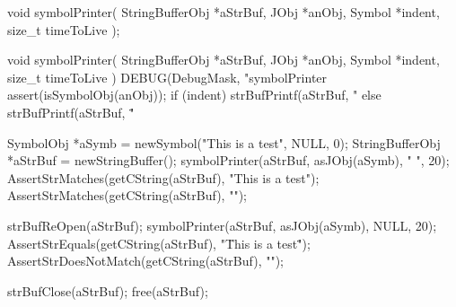 \startTestSuite[symbolPrinter]

\startCHeader
void symbolPrinter(
  StringBufferObj *aStrBuf,
  JObj            *anObj,
  Symbol          *indent,
  size_t           timeToLive
);
\stopCHeader

\startCCode
void symbolPrinter(
  StringBufferObj *aStrBuf,
  JObj            *anObj,
  Symbol          *indent,
  size_t           timeToLive
) {
  DEBUG(DebugMask, "symbolPrinter %
  assert(isSymbolObj(anObj));
  if (indent) {
    strBufPrintf(aStrBuf, "%
  } else {
    strBufPrintf(aStrBuf, "\"%
  }
}
\stopCCode


\startCTest
  SymbolObj *aSymb = newSymbol("This is a test", NULL, 0);
  StringBufferObj *aStrBuf = newStringBuffer();
  symbolPrinter(aStrBuf, asJObj(aSymb), "  ", 20);
  AssertStrMatches(getCString(aStrBuf), "This is a test");
  AssertStrMatches(getCString(aStrBuf), "\n");
  
  strBufReOpen(aStrBuf);
  symbolPrinter(aStrBuf, asJObj(aSymb), NULL, 20);
  AssertStrEquals(getCString(aStrBuf), "\"This is a test\" ");
  AssertStrDoesNotMatch(getCString(aStrBuf), "\n");
  
  strBufClose(aStrBuf);
  free(aStrBuf);
\stopCTest

\stopTestCase
\stopTestSuite